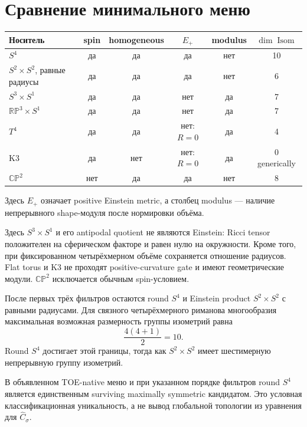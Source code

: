 \section{Сравнение минимального меню}

\begin{center}
\scriptsize
\begin{tabular}{@{}lccccc@{}}
\toprule
Носитель & spin & homogeneous & \(E_+\) & modulus &
\(\dim\operatorname{Isom}\) \\
\midrule
\(S^4\) & да & да & да & нет & 10 \\
\(S^2\times S^2\), равные радиусы & да & да & да & нет & 6 \\
\(S^3\times S^1\) & да & да & нет & да & 7 \\
\(\mathbb{RP}^3\times S^1\) & да & да & нет & да & 7 \\
\(T^4\) & да & да & нет: \(R=0\) & да & 4 \\
K3 & да & нет & нет: \(R=0\) & да & 0 generically \\
\(\mathbb{CP}^2\) & нет & да & да & нет & 8 \\
\bottomrule
\end{tabular}
\end{center}

Здесь \(E_+\) означает positive Einstein metric, а столбец modulus ---
наличие непрерывного shape-модуля после нормировки объёма.

Здесь \(S^3\times S^1\) и его antipodal quotient не являются Einstein:
Ricci tensor положителен на сферическом факторе и равен нулю на окружности.
Кроме того, при фиксированном четырёхмерном объёме сохраняется отношение
радиусов. Flat torus и K3 не проходят positive-curvature gate и имеют
геометрические модули. \(\mathbb{CP}^2\) исключается обычным spin-условием.

После первых трёх фильтров остаются round \(S^4\) и Einstein product
\(S^2\times S^2\) с равными радиусами. Для связного четырёхмерного
риманова многообразия максимальная возможная размерность группы изометрий
равна
\begin{equation}
 \frac{4(4+1)}2=10.
\end{equation}
Round \(S^4\) достигает этой границы, тогда как
\(S^2\times S^2\) имеет шестимерную непрерывную группу изометрий.

\begin{proposition}
В объявленном TOE-native меню и при указанном порядке фильтров round
\(S^4\) является единственным surviving maximally symmetric кандидатом.
Это условная классификационная уникальность, а не вывод глобальной топологии
из уравнения для \(\widehat C_\sigma\).
\end{proposition}

